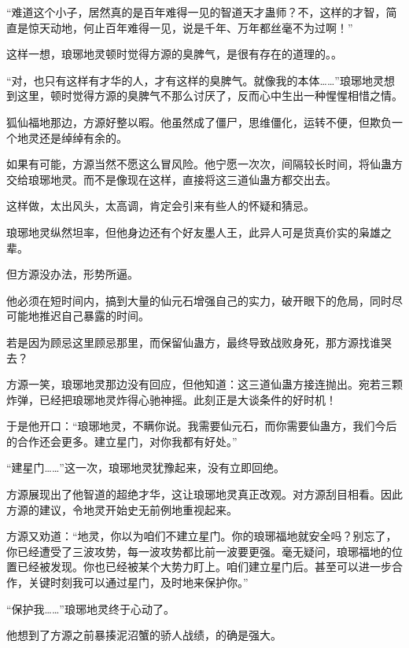 
\begin{this_body}

“难道这个小子，居然真的是百年难得一见的智道天才蛊师？不，这样的才智，简直是惊天动地，何止百年难得一见，说是千年、万年都丝毫不为过啊！”

这样一想，琅琊地灵顿时觉得方源的臭脾气，是很有存在的道理的。。

“对，也只有这样有才华的人，才有这样的臭脾气。就像我的本体……”琅琊地灵想到这里，顿时觉得方源的臭脾气不那么讨厌了，反而心中生出一种惺惺相惜之情。

狐仙福地那边，方源好整以暇。他虽然成了僵尸，思维僵化，运转不便，但欺负一个地灵还是绰绰有余的。

如果有可能，方源当然不愿这么冒风险。他宁愿一次次，间隔较长时间，将仙蛊方交给琅琊地灵。而不是像现在这样，直接将这三道仙蛊方都交出去。

这样做，太出风头，太高调，肯定会引来有些人的怀疑和猜忌。

琅琊地灵纵然坦率，但他身边还有个好友墨人王，此异人可是货真价实的枭雄之辈。

但方源没办法，形势所逼。

他必须在短时间内，搞到大量的仙元石增强自己的实力，破开眼下的危局，同时尽可能地推迟自己暴露的时间。

若是因为顾忌这里顾忌那里，而保留仙蛊方，最终导致战败身死，那方源找谁哭去？

方源一笑，琅琊地灵那边没有回应，但他知道：这三道仙蛊方接连抛出。宛若三颗炸弹，已经把琅琊地灵炸得心驰神摇。此刻正是大谈条件的好时机！

于是他开口：“琅琊地灵，不瞒你说。我需要仙元石，而你需要仙蛊方，我们今后的合作还会更多。建立星门，对你我都有好处。”

“建星门……”这一次，琅琊地灵犹豫起来，没有立即回绝。

方源展现出了他智道的超绝才华，这让琅琊地灵真正改观。对方源刮目相看。因此方源的建议，令地灵开始史无前例地重视起来。

方源又劝道：“地灵，你以为咱们不建立星门。你的琅琊福地就安全吗？别忘了，你已经遭受了三波攻势，每一波攻势都比前一波要更强。毫无疑问，琅琊福地的位置已经被发现。你也已经被某个大势力盯上。咱们建立星门后。甚至可以进一步合作，关键时刻我可以通过星门，及时地来保护你。”

“保护我……”琅琊地灵终于心动了。

他想到了方源之前暴揍泥沼蟹的骄人战绩，的确是强大。


\end{this_body}
